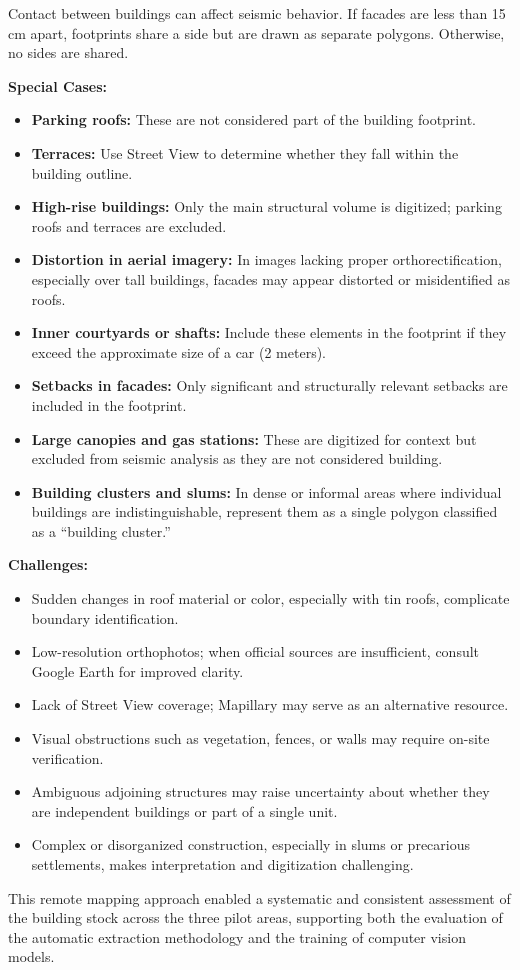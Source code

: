 Contact between buildings can affect seismic behavior. If facades are less than 15 cm apart, footprints share a side but are drawn as separate polygons. Otherwise, no sides are shared. 


\textbf{Special Cases:}

\begin{itemize}
    \item \textbf{Parking roofs:} These are not considered part of the building footprint.
    \item \textbf{Terraces:} Use Street View to determine whether they fall within the building outline.
    \item \textbf{High-rise buildings:} Only the main structural volume is digitized; parking roofs and terraces are excluded.
    \item \textbf{Distortion in aerial imagery:} In images lacking proper orthorectification, especially over tall buildings, facades may appear distorted or misidentified as roofs.
    \item \textbf{Inner courtyards or shafts:} Include these elements in the footprint if they exceed the approximate size of a car (2 meters).
    \item \textbf{Setbacks in facades:} Only significant and structurally relevant setbacks are included in the footprint.
    \item \textbf{Large canopies and gas stations:} These are digitized for context but excluded from seismic analysis as they are not considered building.
    \item \textbf{Building clusters and slums:} In dense or informal areas where individual buildings are indistinguishable, represent them as a single polygon classified as a “building cluster.”
\end{itemize}

\textbf{Challenges:}
\begin{itemize}
    \item Sudden changes in roof material or color, especially with tin roofs, complicate boundary identification.
    \item Low-resolution orthophotos; when official sources are insufficient, consult Google Earth for improved clarity.
    \item Lack of Street View coverage; Mapillary may serve as an alternative resource.
    \item Visual obstructions such as vegetation, fences, or walls may require on-site verification.
    \item Ambiguous adjoining structures may raise uncertainty about whether they are independent buildings or part of a single unit.
    \item Complex or disorganized construction, especially in slums or precarious settlements, makes interpretation and digitization challenging.
\end{itemize}


This remote mapping approach enabled a systematic and consistent assessment of the building stock across the three pilot areas, supporting both the evaluation of the automatic extraction methodology and the training of computer vision models.

